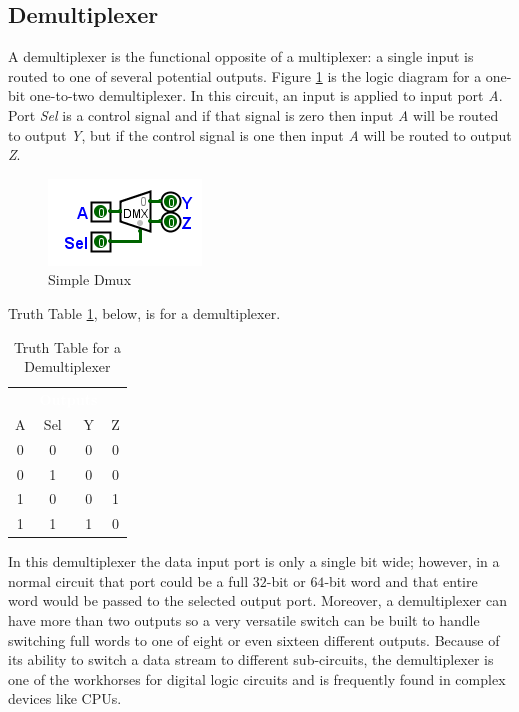 \subsection{Demultiplexer}
\label{CL:subsec:demultiplexer}

A demultiplexer is the functional opposite of a multiplexer: a single input is routed to one of several potential outputs. Figure \ref{fig:08_02} is the logic diagram for a one-bit one-to-two demultiplexer. In this circuit, an input is applied to input port \emph{A}. Port \emph{Sel} is a control signal and if that signal is zero then input \emph{A} will be routed to output \emph{Y}, but if the control signal is one then input \emph{A} will be routed to output \emph{Z}.

\begin{figure}[H]
	\centering
	\includegraphics[width=\maxwidth{.95\linewidth}]{gfx/08_02}
	\caption{Simple Dmux}
	\label{fig:08_02}
\end{figure}

Truth Table \ref{tab:08_02}, below, is for a demultiplexer.

\begin{table}[H]
  \sffamily
  \newcommand{\head}[1]{\textcolor{white}{\textbf{#1}}}    
  \begin{center}
    \begin{tabular}{cc|cc} 
      \rowcolor{black!75}
      \multicolumn{2}{c}{\head{Inputs}} & \multicolumn{2}{c}{\head{Outputs}} \\
      A & Sel & Y & Z \\
      \hline
      0 & 0 & 0 & 0 \\
      0 & 1 & 0 & 0 \\
      1 & 0 & 0 & 1 \\
      1 & 1 & 1 & 0 
    \end{tabular}
  \end{center}
  \caption{Truth Table for a Demultiplexer}
  \label{tab:08_02}
\end{table}

In this demultiplexer the data input port is only a single bit wide; however, in a normal circuit that port could be a full $ 32 $-bit or $ 64 $-bit word and that entire word would be passed to the selected output port. Moreover, a demultiplexer can have more than two outputs so a very versatile switch can be built to handle switching full words to one of eight or even sixteen different outputs. Because of its ability to switch a data stream to different sub-circuits, the demultiplexer is one of the workhorses for digital logic circuits and is frequently found in complex devices like \acp{CPU}.

